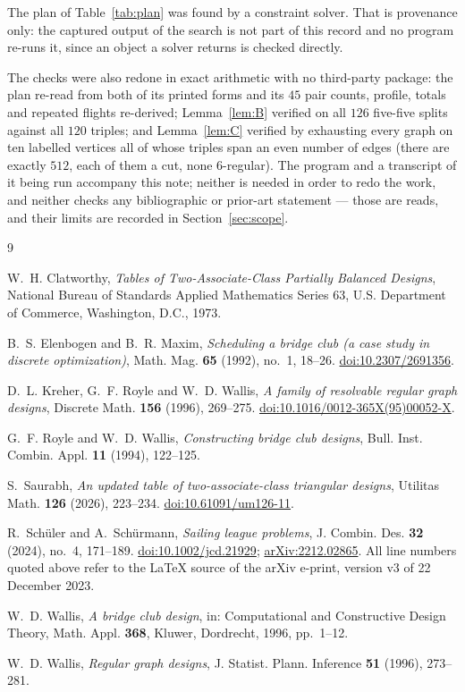 \documentclass[11pt]{amsart}
\theoremstyle{remark}
\begin{document}
The plan of Table~\ref{tab:plan} was found by a constraint solver. That is
provenance only: the captured output of the search is not part of this record
and no program re-runs it, since an object a solver returns is checked
directly.

The checks were also redone in exact arithmetic with no third-party package:
the plan re-read from both of its printed forms and its $45$ pair counts,
profile, totals and repeated flights re-derived; Lemma~\ref{lem:B} verified on
all $126$ five-five splits against all $120$ triples; and Lemma~\ref{lem:C}
verified by exhausting every graph on ten labelled vertices all of whose
triples span an even number of edges (there are exactly $512$, each of them a
cut, none $6$-regular). The program and a transcript of it being run accompany
this note; neither is needed in order to redo the work, and neither checks any
bibliographic or prior-art statement --- those are reads, and their limits are
recorded in Section~\ref{sec:scope}.

\begin{thebibliography}{9}

W.~H. Clatworthy,
\emph{Tables of Two-Associate-Class Partially Balanced Designs},
National Bureau of Standards Applied Mathematics Series 63,
U.S. Department of Commerce, Washington, D.C., 1973.

B.~S. Elenbogen and B.~R. Maxim,
\emph{Scheduling a bridge club (a case study in discrete optimization)},
Math. Mag. \textbf{65} (1992), no.~1, 18--26.
\href{https://doi.org/10.2307/2691356}{doi:10.2307/2691356}.

D.~L. Kreher, G.~F. Royle and W.~D. Wallis,
\emph{A family of resolvable regular graph designs},
Discrete Math. \textbf{156} (1996), 269--275.
\href{https://doi.org/10.1016/0012-365X(95)00052-X}{doi:10.1016/0012-365X(95)00052-X}.

G.~F. Royle and W.~D. Wallis,
\emph{Constructing bridge club designs},
Bull. Inst. Combin. Appl. \textbf{11} (1994), 122--125.

S.~Saurabh,
\emph{An updated table of two-associate-class triangular designs},
Utilitas Math. \textbf{126} (2026), 223--234.
\href{https://doi.org/10.61091/um126-11}{doi:10.61091/um126-11}.

R.~Sch\"uler and A.~Sch\"urmann,
\emph{Sailing league problems},
J. Combin. Des. \textbf{32} (2024), no.~4, 171--189.
\href{https://doi.org/10.1002/jcd.21929}{doi:10.1002/jcd.21929};
\href{https://arxiv.org/abs/2212.02865}{arXiv:2212.02865}.
All line numbers quoted above refer to the \LaTeX{} source of the arXiv
e-print, version v3 of 22 December 2023.

W.~D. Wallis,
\emph{A bridge club design},
in: Computational and Constructive Design Theory,
Math. Appl. \textbf{368}, Kluwer, Dordrecht, 1996, pp.~1--12.

W.~D. Wallis,
\emph{Regular graph designs},
J. Statist. Plann. Inference \textbf{51} (1996), 273--281.

\end{thebibliography}
\end{document}

